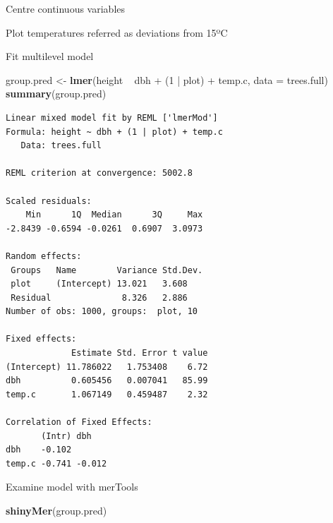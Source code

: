 \documentclass[10pt,ignorenonframetext,]{beamer}
\newenvironment{Shaded}{\begin{snugshade}}{\end{snugshade}}
\newcommand{\KeywordTok}[1]{\textcolor[rgb]{0.13,0.29,0.53}{\textbf{{#1}}}}
\newcommand{\DataTypeTok}[1]{\textcolor[rgb]{0.13,0.29,0.53}{{#1}}}
\newcommand{\DecValTok}[1]{\textcolor[rgb]{0.00,0.00,0.81}{{#1}}}
\newcommand{\StringTok}[1]{\textcolor[rgb]{0.31,0.60,0.02}{{#1}}}
\newcommand{\NormalTok}[1]{{#1}}
\begin{document}
\begin{frame}[fragile]{Centre continuous variables}

Plot temperatures referred as deviations from 15ºC

\begin{Shaded}
\end{Shaded}

\end{frame}

\begin{frame}[fragile]{Fit multilevel model}

\begin{Shaded}
\begin{Highlighting}[]
\NormalTok{group.pred <-}\StringTok{ }\KeywordTok{lmer}\NormalTok{(height ~}\StringTok{ }\NormalTok{dbh +}\StringTok{ }\NormalTok{(}\DecValTok{1} \NormalTok{|}\StringTok{ }\NormalTok{plot) +}\StringTok{ }\NormalTok{temp.c, }\DataTypeTok{data =} \NormalTok{trees.full)}
\KeywordTok{summary}\NormalTok{(group.pred)}
\end{Highlighting}
\end{Shaded}

\begin{verbatim}
Linear mixed model fit by REML ['lmerMod']
Formula: height ~ dbh + (1 | plot) + temp.c
   Data: trees.full

REML criterion at convergence: 5002.8

Scaled residuals: 
    Min      1Q  Median      3Q     Max 
-2.8439 -0.6594 -0.0261  0.6907  3.0973 

Random effects:
 Groups   Name        Variance Std.Dev.
 plot     (Intercept) 13.021   3.608   
 Residual              8.326   2.886   
Number of obs: 1000, groups:  plot, 10

Fixed effects:
             Estimate Std. Error t value
(Intercept) 11.786022   1.753408    6.72
dbh          0.605456   0.007041   85.99
temp.c       1.067149   0.459487    2.32

Correlation of Fixed Effects:
       (Intr) dbh   
dbh    -0.102       
temp.c -0.741 -0.012
\end{verbatim}

\end{frame}

\begin{frame}[fragile]{Examine model with merTools}

\begin{Shaded}
\begin{Highlighting}[]
\KeywordTok{shinyMer}\NormalTok{(group.pred)}
\end{Highlighting}
\end{Shaded}

\end{frame}
\end{document}
